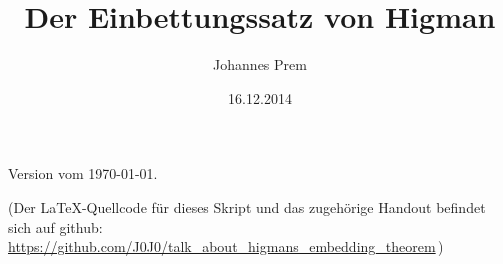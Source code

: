 
\subject{Seminar: Das Wortproblem}
\title{Der Einbettungssatz von Higman}
\author{Johannes Prem}
\date{16.12.2014}

\maketitle
\thispagestyle{empty}

\vfill
\begin{center}\footnotesize%
    Version vom \today.
    
    \medskip
    (Der \LaTeX-Quellcode für dieses Skript und das zugehörige Handout befindet
    sich auf github: 
    \url{https://github.com/J0J0/talk_about_higmans_embedding_theorem}\,)
\end{center}
\newpage
